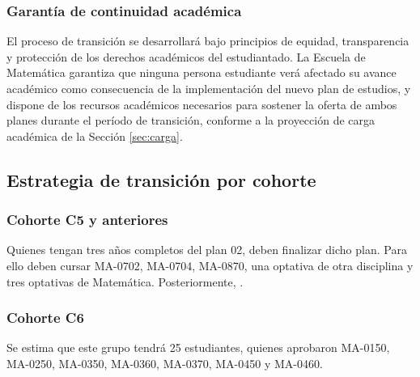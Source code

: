 \subsubsection{Garantía de continuidad académica}
El proceso de transición se desarrollará bajo principios de equidad, transparencia y protección de los derechos académicos del estudiantado. La Escuela de Matemática garantiza que ninguna persona estudiante verá afectado su avance académico como consecuencia de la implementación del nuevo plan de estudios, y dispone de los recursos académicos necesarios para sostener la oferta de ambos planes durante el período de transición, conforme a la proyección de carga académica de la Sección \ref{sec:carga}.
\subsection{Estrategia de transición por cohorte}
\label{sec:cohortes}

\subsubsection{Cohorte C5 y anteriores}
Quienes tengan tres años completos del plan 02, deben finalizar dicho plan. Para ello deben cursar MA-0702, MA-0704, MA-0870, una optativa de otra disciplina y tres optativas de Matemática. Posteriormente, .

\subsubsection{Cohorte C6}
Se estima que este grupo tendrá 25 estudiantes, quienes aprobaron MA-0150, MA-0250, MA-0350, MA-0360, MA-0370, MA-0450 y MA-0460.

